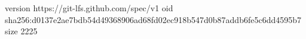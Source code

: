 version https://git-lfs.github.com/spec/v1
oid sha256:d0137e2ae7bdb54d49368906ad68fd02ec918b547d0b87addb6fe5c6dd4595b7
size 2225
